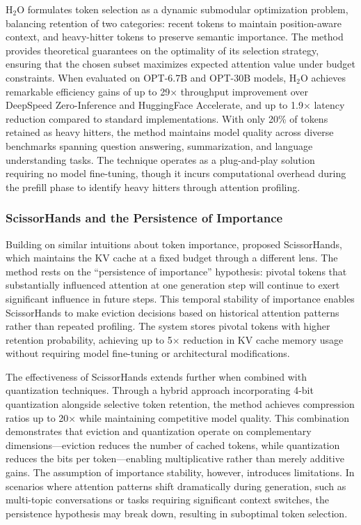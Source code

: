 \documentclass[11pt,letterpaper]{article}
\begin{document}
H$_2$O formulates token selection as a dynamic submodular optimization problem, balancing retention of two categories: recent tokens to maintain position-aware context, and heavy-hitter tokens to preserve semantic importance. The method provides theoretical guarantees on the optimality of its selection strategy, ensuring that the chosen subset maximizes expected attention value under budget constraints. When evaluated on OPT-6.7B and OPT-30B models, H$_2$O achieves remarkable efficiency gains of up to 29$\times$ throughput improvement over DeepSpeed Zero-Inference and HuggingFace Accelerate, and up to 1.9$\times$ latency reduction compared to standard implementations. With only 20\% of tokens retained as heavy hitters, the method maintains model quality across diverse benchmarks spanning question answering, summarization, and language understanding tasks. The technique operates as a plug-and-play solution requiring no model fine-tuning, though it incurs computational overhead during the prefill phase to identify heavy hitters through attention profiling.

\subsubsection{ScissorHands and the Persistence of Importance}

Building on similar intuitions about token importance, \cite{liu2023scissorhands} proposed ScissorHands, which maintains the KV cache at a fixed budget through a different lens. The method rests on the ``persistence of importance'' hypothesis: pivotal tokens that substantially influenced attention at one generation step will continue to exert significant influence in future steps. This temporal stability of importance enables ScissorHands to make eviction decisions based on historical attention patterns rather than repeated profiling. The system stores pivotal tokens with higher retention probability, achieving up to 5$\times$ reduction in KV cache memory usage without requiring model fine-tuning or architectural modifications.

The effectiveness of ScissorHands extends further when combined with quantization techniques. Through a hybrid approach incorporating 4-bit quantization alongside selective token retention, the method achieves compression ratios up to 20$\times$ while maintaining competitive model quality. This combination demonstrates that eviction and quantization operate on complementary dimensions---eviction reduces the number of cached tokens, while quantization reduces the bits per token---enabling multiplicative rather than merely additive gains. The assumption of importance stability, however, introduces limitations. In scenarios where attention patterns shift dramatically during generation, such as multi-topic conversations or tasks requiring significant context switches, the persistence hypothesis may break down, resulting in suboptimal token selection.
\end{document}
